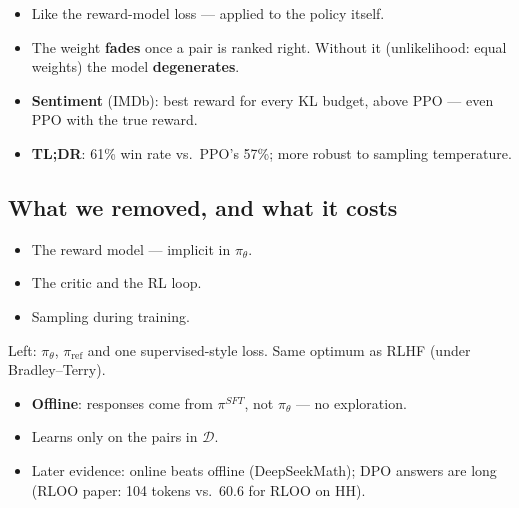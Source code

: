 \begin{minipage}[c]{0.45\linewidth}
\centering
{}
\end{minipage}\hfill
\begin{minipage}[c]{0.52\linewidth}
\begin{itemize}
  \item Like the reward-model loss --- applied to the policy itself.
  \item The weight \textbf{fades} once a pair is ranked right. Without it (unlikelihood: equal weights) the model \textbf{degenerates}.
  \item \textbf{Sentiment} (IMDb): best reward for every KL budget, above PPO --- even PPO with the true reward.
  \item \textbf{TL;DR}: 61\% win rate vs.\ PPO's 57\%; more robust to sampling temperature.
\end{itemize}
\end{minipage}

\subsection{What we removed, and what it costs}

\begin{pair}
\begin{keybox}[title={Removed}]
\begin{itemize}
  \item The reward model --- implicit in $\pi_\theta$.
  \item The critic and the RL loop.
  \item Sampling during training.
\end{itemize}
Left: $\pi_\theta$, $\pi_{\mathrm{ref}}$ and one supervised-style loss. Same optimum as RLHF (under Bradley--Terry).
\end{keybox}
\begin{warnbox}[title={Costs}]
\begin{itemize}
  \item \textbf{Offline}: responses come from $\pi^{SFT}$, not $\pi_\theta$ --- no exploration.
  \item Learns only on the pairs in $\mathcal D$.
  \item Later evidence: online beats offline (DeepSeekMath); DPO answers are long (RLOO paper: 104 tokens vs.\ 60.6 for RLOO on HH).
\end{itemize}
\end{warnbox}
\end{pair}

